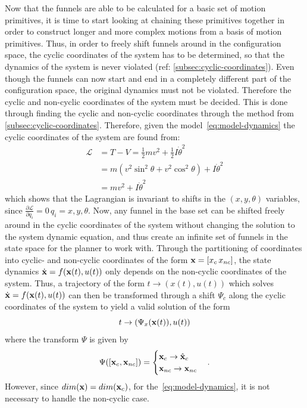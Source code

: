 Now that the funnels are able to be calculated for a basic set of motion
primitives, it is time to start looking at chaining these primitives together in
order to construct longer and more complex motions from a basis of motion
primitives. Thus, in order to freely shift funnels around in the configuration
space, the cyclic coordinates of the system has to be determined, so that the
dynamics of the system is never violated (ref:
\cref{subsec:cyclic-coordinates}). Even though the funnels can now start and end
in a completely different part of the configuration space, the original dynamics
must not be violated. Therefore the cyclic and non-cyclic coordinates of the
system must be decided. This is done through finding the cyclic and non-cyclic
coordinates through the method from \cref{subsec:cyclic-coordinates}. Therefore,
given the model~\cref{eq:model-dynamics} the cyclic coordinates of the system
are found from:
\begin{align*}
  \mathcal{L} &= T - V = \frac{1}{2} mv^2 + \frac{1}{2}I\dot{\theta}^2 \\ 
              &= m \left(
                v^2 \sin^2 \theta + v^2 \cos^2 \theta
                \right)  + I {\dot{\theta}}^2 \\
              &= mv^2 + I {\dot{\theta}}^2
\end{align*}
which shows that the Lagrangian is invariant to shifts in the \((x,y,\theta)\)
variables, since \(\frac{\partial\mathcal{L}}{\partial q_i} = 0 \, q_i =
x,y,\theta\). Now, any funnel in the base set can be shifted freely around in
the cyclic coordinates of the system without changing the solution to the system
dynamic equation, and thus create an infinite set of funnels in the state space
for the planner to work with. Through the partitioning of coordinates into
cyclic- and non-cyclic coordinates of the form \(\mathsf{\mathbf{x}} = [x_c\, x_{nc}]\),
the state dynamics \(\dot{\mathsf{\mathbf{x}}} = f(\mathsf{\mathbf{x}} (t), u(t))\) only depends on
the non-cyclic coordinates of the system. Thus, a trajectory of the form \(t
\rightarrow (x(t),u(t))\) which solves \(\dot{\mathsf{\mathbf{x}}} = f(\mathsf{\mathbf{x}}(t),u(t))\)
can then be transformed through a shift \(\Psi_c\) along the cyclic coordinates
of the system to yield a valid solution of the form
\[
  t \rightarrow (\Psi_{x}(\mathsf{\mathbf{x}}(t)), u(t))
\]
where the transform \(\Psi\) is given by
\[
  \Psi([\mathsf{\mathbf{x}}_c, \mathsf{\mathbf{x}}_{nc}]) =
  \begin{cases}
    \mathsf{\mathbf{x}}_c \rightarrow \hat{\mathsf{\mathbf{x}}}_{c} \\
    \mathsf{\mathbf{x}}_{nc} \rightarrow \mathsf{\mathbf{x}}_{nc} \\
  \end{cases}.
\]
However, since \(\mathnormal{dim}(\mathsf{\mathbf{x}}) = \mathnormal{dim}(\mathsf{\mathbf{x}}_c) \),
for the~\cref{eq:model-dynamics}, it is not necessary to handle the non-cyclic
case.

